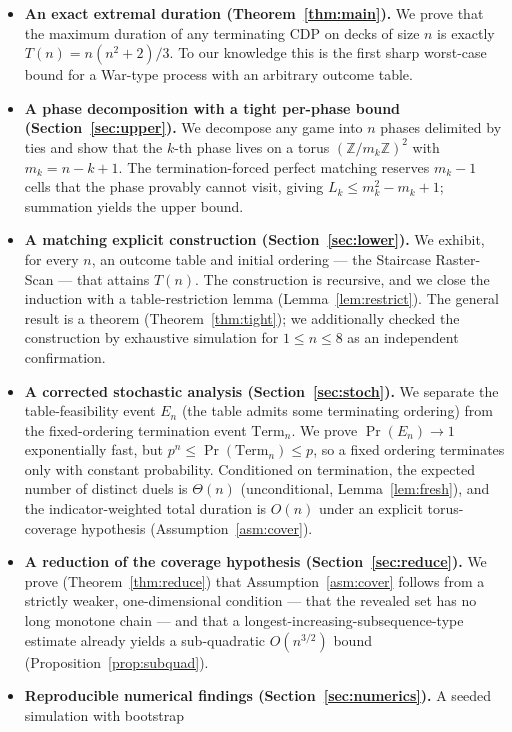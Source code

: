 \documentclass[11pt]{article}
\theoremstyle{definition}
\theoremstyle{remark}
\newcommand{\Term}{\mathrm{Term}}
\newcommand{\Z}{\mathbb{Z}}
\begin{document}
\begin{itemize}[leftmargin=1.4em]
\item \textbf{An exact extremal duration (Theorem~\ref{thm:main}).} We prove that the maximum duration of any
terminating CDP on decks of size $n$ is exactly $T(n) = n(n^2 + 2)/3$. To our knowledge this is
the first sharp worst-case bound for a War-type process with an arbitrary outcome table.
\item \textbf{A phase decomposition with a tight per-phase bound (Section~\ref{sec:upper}).} We decompose any
game into $n$ phases delimited by ties and show that the $k$-th phase lives on a torus $(\Z/m_k\Z)^2$
with $m_k = n - k + 1$. The termination-forced perfect matching reserves $m_k - 1$ cells that the
phase provably cannot visit, giving $L_k \le m_k^2 - m_k + 1$; summation yields the upper bound.
\item \textbf{A matching explicit construction (Section~\ref{sec:lower}).} We exhibit, for every $n$, an outcome table
and initial ordering --- the Staircase Raster-Scan --- that attains $T(n)$. The construction is
recursive, and we close the induction with a table-restriction lemma (Lemma~\ref{lem:restrict}). The
general result is a theorem (Theorem~\ref{thm:tight}); we additionally checked the construction by
exhaustive simulation for $1 \le n \le 8$ as an independent confirmation.
\item \textbf{A corrected stochastic analysis (Section~\ref{sec:stoch}).} We separate the table-feasibility event $E_n$ (the
table admits some terminating ordering) from the fixed-ordering termination event $\Term_n$. We
prove $\Pr(E_n) \to 1$ exponentially fast, but $p^n \le \Pr(\Term_n) \le p$, so a fixed ordering terminates
only with constant probability. Conditioned on termination, the expected number of distinct
duels is $\Theta(n)$ (unconditional, Lemma~\ref{lem:fresh}), and the indicator-weighted total duration is $O(n)$
under an explicit torus-coverage hypothesis (Assumption~\ref{asm:cover}).
\item \textbf{A reduction of the coverage hypothesis (Section~\ref{sec:reduce}).} We prove (Theorem~\ref{thm:reduce}) that
Assumption~\ref{asm:cover} follows from a strictly weaker, one-dimensional condition --- that the revealed set
has no long monotone chain --- and that a longest-increasing-subsequence-type estimate already
yields a sub-quadratic $O(n^{3/2})$ bound (Proposition~\ref{prop:subquad}).
\item \textbf{Reproducible numerical findings (Section~\ref{sec:numerics}).} A seeded simulation with bootstrap

\end{itemize}
\end{document}
